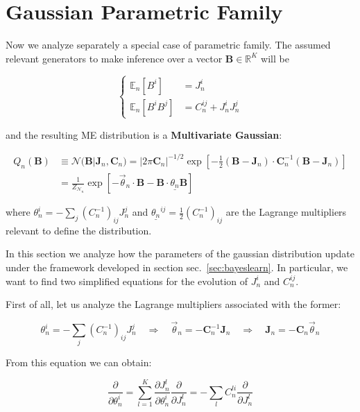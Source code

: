 \documentclass[12pt,a4paperpaper,]{tufte-book}
\begin{document}
\hypertarget{sec:bayesgausslearn}{%
\section{Gaussian Parametric Family}\label{sec:bayesgausslearn}}

Now we analyze separately a special case of parametric family. The assumed relevant generators to make inference over a vector \(\mathbf{B}\in \mathbb{R}^K\) will be

\[\begin{cases} 
    \mathbb{E}_n[B^{i}] &= J^{i}_n \\  
    \mathbb{E}_n[B^{i}B^{j}] &= C^{ij}_n + J^{i}_n J^{j}_n
    \end{cases}\]

and the resulting ME distribution is a \textbf{Multivariate Gaussian}:

\begin{align}
    \label{eq:multigaussian}
      Q_n(\mathbf{B}) &\equiv \mathcal{N}(\mathbf{B}| \mathbf{J}_n, \mathbf{C}_n) = |2\pi \mathbf{C}_n|^{-1/2} \exp\left[ -\frac12 (\mathbf{B}- \mathbf{J}_n) \cdot \mathbf{C}_n^{-1} (\mathbf{B}- \mathbf{J}_n) \right] \\
    &= \frac{1}{Z_{\mathcal{N}_n}} \exp\left[ -\vec{\theta}_n\cdot \mathbf{B}- \mathbf{B}\cdot \underline{\theta_n} \mathbf{B}\right]
\end{align}

where \(\theta^i_n = - \sum_j \left( C^{-1}_n\right)_{ij}J^{j}_n\) and \(\underline{\theta_n}^{ij} = \frac12 \left( C^{-1}_n \right)_{ij}\) are the Lagrange multipliers relevant to define the distribution.

In this section we analyze how the parameters of the gaussian distribution update under the framework developed in section sec.~\ref{sec:bayeslearn}. In particular, we want to find two simplified equations for the evolution of \(J^{i}_n\) and \(C^{ij}_n\).

First of all, let us analyze the Lagrange multipliers associated with the former:

\[\theta^i_n = - \sum_j \left( C^{-1}_n\right)_{ij}J^{j}_n\quad \Rightarrow\quad \vec{\theta}_n =  - \mathbf{C}_n^{-1} \mathbf{J}_n\quad \Rightarrow\quad \mathbf{J}_n = - \mathbf{C}_n \vec{\theta}_n\]

From this equation we can obtain:

\[\frac{\partial}{\partial \theta_n^i} = \sum_{l=1}^K \frac{\partial J^{l}_n}{\partial \theta_n^i} \frac{\partial}{\partial J^{l}_n} = - \sum_l C_n^{li} \frac{\partial}{\partial J^{l}_n}\]
\end{document}
